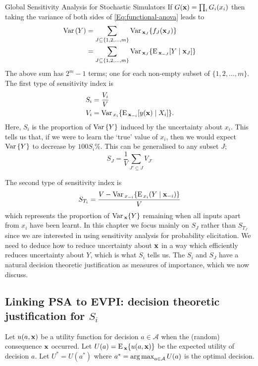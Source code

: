 \begin{chapter}{Global Sensitivity Analysis for Stochastic Simulators\label{Ch:sensitivity}}
If $G(\mathbf{x}) = \prod_i G_i(x_i)$ then taking the variance of both sides of \cref{Eq:functional-anova} leads to
\begin{align}
 \mathrm{Var}\,(Y) &= \sum_{J \subseteq \{1, 2, \ldots, m\} }  \mathrm{Var}\,_{\mathbf{x}_{J}} \{ f_J(\mathbf{x}_J) \}\\
         &= \sum_{J \subseteq \{1, 2, \ldots, m\} }  \mathrm{Var}\,_{\mathbf{x}_{J}}  \{ \textrm{E}\,_{\mathbf{x}_{-J}} [ Y \mid \mathbf{x}_J ] \}
\end{align}
The above sum has $2^{m} - 1$ terms; one for each non-empty subset of $\{1, 2, \ldots, m \}$.
The first type of sensitivity index is
\begin{align}
    S_i &= \frac{V_i}{V}\\
    V_i & = \mathrm{Var}\,_{x_{i}} \{ \textrm{E}\,_{\mathbf{x}_{-i}} [ y(\mathbf{x}) \mid X_{i} ] \}.
\end{align}
Here, $S_i$ is the proportion of $\mathrm{Var}\,\{Y\}$ induced by the uncertainty about $x_i$. This tells us that, if we were to learn the `true' value of $x_i$, then we would expect $\mathrm{Var}\,\{Y\}$ to decrease by $100S_i\%$. This can be generalised to any subset $J$;
\begin{equation}
 S_J = \frac{1}{V} \sum_{J' \subseteq J} V_{J'}
\end{equation}

The second type of sensitivity index is
\begin{equation}
    S_{T_i} = \frac{V - \mathrm{Var}\,_{x_{-i}} \{ \textrm{E}\,_{x_i} (Y \mid \mathbf{x}_{-i}) \} }{V}
\end{equation}
which represents the proportion of $\mathrm{Var}\,_{\mathbf{x}} \{Y\}$ remaining when all inputs apart from $x_i$ have been learnt.  In this chapter we focus mainly on $S_J$ rather than $S_{T_J}$ since we are interested in using sensitivity analysis for probability elicitation. We need to deduce how to reduce uncertainty about $\mathbf{x}$ in a way which efficiently reduces uncertainty about $Y$, which is what $S_i$ tells us. The $S_i$ and $S_J$ have a natural decision theoretic justification as measures of importance, which we now discuss.
\subsection{Linking PSA to EVPI: decision theoretic justification for $S_i$}
Let $u(a, \mathbf{x})$ be a utility function for decision $a \in \mathcal{A}$ when the (random) consequence $\mathbf{x}$ occurred. Let $U(a) = \textrm{E}\,_{\mathbf{x}} \{ u(a, \mathbf{x}) \} $ be the expected utility of decision $a$. Let $U^* = U(a^*)$ where $a^* = \operatorname*{arg\,max}_{a \in \mathcal{A}} U(a)$ is the optimal decision.


\end{chapter}
